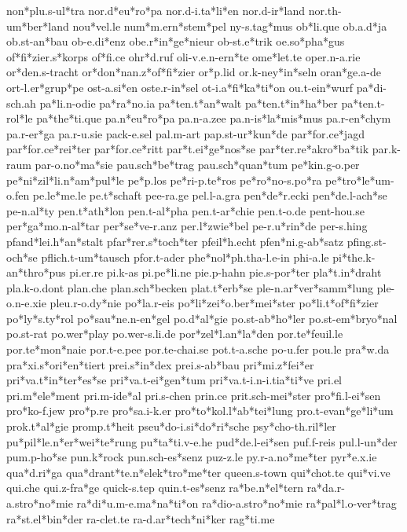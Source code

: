 non*plu.s-ul*tra
nor.d*eu*ro*pa
nor.d-i.ta*li*en
nor.d-ir*land
nor.th-um*ber*land
nou*vel.le
num*m.ern*stem*pel
ny-s.tag*mus
ob*li.que
ob.a.d*ja
ob.st-an*bau
ob-e.di*enz
obe.r*in*ge*nieur
ob-st.e*trik
oe.so*pha*gus
of*fi*zier.s*korps
of*fi.ce
ohr*d.ruf
oli-v.e.n-ern*te
ome*let.te
oper.n-a.rie
or*den.s-tracht
or*don*nan.z*of*fi*zier
or*p.lid
or.k-ney*in*seln
oran*ge.a-de
ort-l.er*grup*pe
ost-a.si*en
oste.r-in*sel
ot-i.a*fi*ka*ti*on
ou.t-ein*wurf
pa*di-sch.ah
pa*li.n-odie
pa*ra*no.ia
pa*ten.t*an*walt
pa*ten.t*in*ha*ber
pa*ten.t-rol*le
pa*the*ti.que
pa.n*eu*ro*pa
pa.n-a.zee
pa.n-is*la*mis*mus
pa.r-en*chym
pa.r-er*ga
pa.r-u.sie
pack-e.sel
pal.m-art
pap.st-ur*kun*de
par*for.ce*jagd
par*for.ce*rei*ter
par*for.ce*ritt
par*t.ei*ge*nos*se
par*ter.re*akro*ba*tik
par.k-raum
par-o.no*ma*sie
pau.sch*be*trag
pau.sch*quan*tum
pe*kin.g-o.per
pe*ni*zil*li.n*am*pul*le
pe*p.los
pe*ri-p.te*ros
pe*ro*no-s.po*ra
pe*tro*le*um-o.fen
pe.le*me.le
pe.t*schaft
pee-ra.ge
pel.l-a.gra
pen*de*r.ecki
pen*de.l-ach*se
pe-n.al*ty
pen.t*ath*lon
pen.t-al*pha
pen.t-ar*chie
pen.t-o.de
pent-hou.se
per*ga*mo.n-al*tar
per*se*ve-r.anz
per.l*zwie*bel
pe-r.u*rin*de
per-s.hing
pfand*lei.h*an*stalt
pfar*rer.s*toch*ter
pfeil*h.echt
pfen*ni.g-ab*satz
pfing.st-och*se
pflich.t-um*tausch
pfor.t-ader
phe*nol*ph.tha-l.e-in
phi-a.le
pi*the.k-an*thro*pus
pi.er.re
pi.k-as
pi.pe*li.ne
pie.p-hahn
pie.s-por*ter
pla*t.in*draht
pla.k-o.dont
plan.che
plan.sch*becken
plat.t*erb*se
ple-n.ar*ver*samm*lung
ple-o.n-e.xie
pleu.r-o.dy*nie
po*la.r-eis
po*li*zei*o.ber*mei*ster
po*li.t*of*fi*zier
po*ly*s.ty*rol
po*sau*ne.n-en*gel
po.d*al*gie
po.st-ab*ho*ler
po.st-em*bryo*nal
po.st-rat
po.wer*play
po.wer-s.li.de
por*zel*l.an*la*den
por.te*feuil.le
por.te*mon*naie
por.t-e.pee
por.te-chai.se
pot.t-a.sche
po-u.fer
pou.le
pra*w.da
pra*xi.s*ori*en*tiert
prei.s*in*dex
prei.s-ab*bau
pri*mi.z*fei*er
pri*va.t*in*ter*es*se
pri*va.t-ei*gen*tum
pri*va.t-i.n-i.tia*ti*ve
pri.el
pri.m*ele*ment
pri.m-ide*al
pri.s-chen
prin.ce
prit.sch-mei*ster
pro*fi.l-ei*sen
pro*ko-f.jew
pro*p.re
pro*sa.i-k.er
pro*to*kol.l*ab*tei*lung
pro.t-evan*ge*li*um
prok.t*al*gie
promp.t*heit
pseu*do-i.si*do*ri*sche
psy*cho-th.ril*ler
pu*pil*le.n*er*wei*te*rung
pu*ta*ti.v-e.he
pud*de.l-ei*sen
puf.f-reis
pul.l-un*der
pum.p-ho*se
pun.k*rock
pun.sch-es*senz
puz-z.le
py.r-a.no*me*ter
pyr*e.x.ie
qua*d.ri*ga
qua*drant*te.n*elek*tro*me*ter
queen.s-town
qui*chot.te
qui*vi.ve
qui.che
qui.z-fra*ge
quick-s.tep
quin.t-es*senz
ra*be.n*el*tern
ra*da.r-a.stro*no*mie
ra*di*u.m-e.ma*na*ti*on
ra*dio-a.stro*no*mie
ra*pal*l.o-ver*trag
ra*st.el*bin*der
ra-clet.te
ra-d.ar*tech*ni*ker
rag*ti.me
